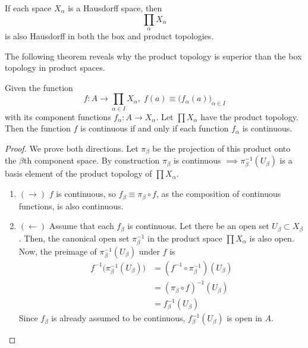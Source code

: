     \begin{theorem}
      If each space $X_\alpha$ is a Hausdorff space, then 
      \begin{equation}
        \prod_{\alpha} X_\alpha
      \end{equation}
      is also Hausdorff in both the box and product topologies. 
    \end{theorem}

    The following theorem reveals why the product topology is superior than the box topology in product spaces. 

    \begin{theorem}
      Given the function 
      \begin{equation}
        f: A \rightarrow \prod_{\alpha \in I} X_\alpha, \; f(a) \equiv \big( f_\alpha (a) \big)_{\alpha \in I}
      \end{equation}
      with its component functions $f_\alpha: A \rightarrow X_\alpha$. Let $\prod X_\alpha$ have the product topology. Then the function $f$ is continuous if and only if each function $f_\alpha$ is continuous. 
    \end{theorem}
    \begin{proof}
      We prove both directions. Let $\pi_\beta$ be the projection of this product onto the $\beta$th component space. By construction $\pi_\beta$ is continuous $\implies \pi_\beta^{-1} (U_\beta)$ is a basis element of the product topology of $\prod X_\alpha$. 
      \begin{enumerate}
        \item $(\rightarrow)$ $f$ is continuous, so $f_\beta \equiv \pi_\beta \circ f$, as the composition of continuous functions, is also continuous. 
        \item $(\leftarrow)$ Assume that each $f_\beta$ is continuous. Let there be an open set $U_\beta \subset X_\beta$. Then, the canonical open set $\pi_\beta^{-1}$ in the product space $\prod X_\alpha$ is also open. Now, the preimage of $\pi_\beta^{-1} (U_\beta)$ under $f$ is 
        \begin{align*}
          f^{-1} \big( \pi_\beta^{-1} (U_\beta)\big) & = (f^{-1} \circ \pi_\beta^{-1})(U_\beta) \\
          & = (\pi_\beta \circ f)^{-1} (U_\beta) \\
          & = f_\beta^{-1} (U_\beta)
        \end{align*}
        Since $f_\beta$ is already assumed to be continuous, $f_\beta^{-1} (U_\beta)$ is open in $A$. 
      \end{enumerate}
    \end{proof}


